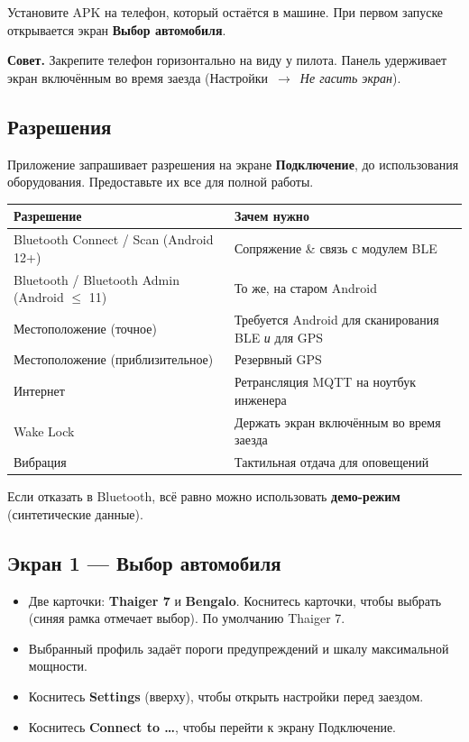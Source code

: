 \documentclass[11pt,a4paper,oneside]{report}
\newcommand{\arrow}{\,$\rightarrow$\,}
\begin{document}
\medskip
Установите APK на телефон, который остаётся в машине. При первом запуске
открывается экран \textbf{Выбор автомобиля}.
\begin{tgnote}
\textbf{Совет.} Закрепите телефон горизонтально на виду у пилота. Панель удерживает
экран включённым во время заезда (Настройки \arrow{} \emph{Не гасить экран}).
\end{tgnote}

\subsection{Разрешения}
Приложение запрашивает разрешения на экране \textbf{Подключение}, до использования
оборудования. Предоставьте их все для полной работы.

\begin{tabularx}{\linewidth}{@{}lL@{}}
\toprule
\textbf{Разрешение} & \textbf{Зачем нужно}\\
\midrule
Bluetooth Connect / Scan (Android 12+) & Сопряжение \& связь с модулем BLE\\
Bluetooth / Bluetooth Admin (Android $\le$ 11) & То же, на старом Android\\
Местоположение (точное) & Требуется Android для сканирования BLE \emph{и} для GPS\\
Местоположение (приблизительное) & Резервный GPS\\
Интернет & Ретрансляция MQTT на ноутбук инженера\\
Wake Lock & Держать экран включённым во время заезда\\
Вибрация & Тактильная отдача для оповещений\\
\bottomrule
\end{tabularx}

\medskip
Если отказать в Bluetooth, всё равно можно использовать \textbf{демо-режим}
(синтетические данные).

\subsection{Экран 1 --- Выбор автомобиля}
\begin{itemize}
  \item Две карточки: \textbf{Thaiger 7} и \textbf{Bengalo}. Коснитесь карточки,
    чтобы выбрать (синяя рамка отмечает выбор). По умолчанию Thaiger 7.
  \item Выбранный профиль задаёт пороги предупреждений и шкалу максимальной
    мощности.
  \item Коснитесь \textbf{Settings} (вверху), чтобы открыть настройки перед заездом.
  \item Коснитесь \textbf{Connect to \ldots}, чтобы перейти к экрану Подключение.
\end{itemize}
\end{document}
